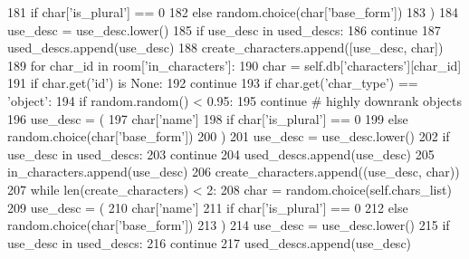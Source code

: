 \begin{DoxyCode}
181                 \textcolor{keywordflow}{if} char[\textcolor{stringliteral}{'is\_plural'}] == 0
182                 \textcolor{keywordflow}{else} random.choice(char[\textcolor{stringliteral}{'base\_form'}])
183             )
184             use\_desc = use\_desc.lower()
185             \textcolor{keywordflow}{if} use\_desc \textcolor{keywordflow}{in} used\_descs:
186                 \textcolor{keywordflow}{continue}
187             used\_descs.append(use\_desc)
188             create\_characters.append([use\_desc, char])
189         \textcolor{keywordflow}{for} char\_id \textcolor{keywordflow}{in} room[\textcolor{stringliteral}{'in\_characters'}]:
190             char = self.db[\textcolor{stringliteral}{'characters'}][char\_id]
191             \textcolor{keywordflow}{if} char.get(\textcolor{stringliteral}{'id'}) \textcolor{keywordflow}{is} \textcolor{keywordtype}{None}:
192                 \textcolor{keywordflow}{continue}
193             \textcolor{keywordflow}{if} char.get(\textcolor{stringliteral}{'char\_type'}) == \textcolor{stringliteral}{'object'}:
194                 \textcolor{keywordflow}{if} random.random() < 0.95:
195                     \textcolor{keywordflow}{continue}  \textcolor{comment}{# highly downrank objects}
196             use\_desc = (
197                 char[\textcolor{stringliteral}{'name'}]
198                 \textcolor{keywordflow}{if} char[\textcolor{stringliteral}{'is\_plural'}] == 0
199                 \textcolor{keywordflow}{else} random.choice(char[\textcolor{stringliteral}{'base\_form'}])
200             )
201             use\_desc = use\_desc.lower()
202             \textcolor{keywordflow}{if} use\_desc \textcolor{keywordflow}{in} used\_descs:
203                 \textcolor{keywordflow}{continue}
204             used\_descs.append(use\_desc)
205             in\_characters.append(use\_desc)
206             create\_characters.append((use\_desc, char))
207         \textcolor{keywordflow}{while} len(create\_characters) < 2:
208             char = random.choice(self.chars\_list)
209             use\_desc = (
210                 char[\textcolor{stringliteral}{'name'}]
211                 \textcolor{keywordflow}{if} char[\textcolor{stringliteral}{'is\_plural'}] == 0
212                 \textcolor{keywordflow}{else} random.choice(char[\textcolor{stringliteral}{'base\_form'}])
213             )
214             use\_desc = use\_desc.lower()
215             \textcolor{keywordflow}{if} use\_desc \textcolor{keywordflow}{in} used\_descs:
216                 \textcolor{keywordflow}{continue}
217             used\_descs.append(use\_desc)

\end{DoxyCode}
